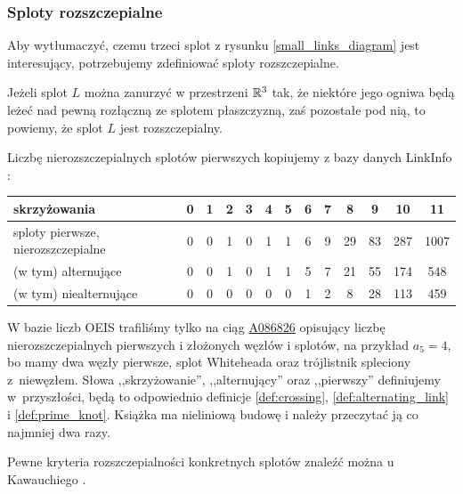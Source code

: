 
\subsubsection{Sploty rozszczepialne}
Aby wytłumaczyć, czemu trzeci splot z rysunku \ref{small_links_diagram} jest interesujący, potrzebujemy zdefiniować sploty rozszczepialne.

\begin{definition}[rozszczepialność]
%
    Jeżeli splot $L$ można zanurzyć w przestrzeni $\mathbb R^3$ tak, że niektóre jego ogniwa będą leżeć nad pewną rozłączną ze splotem płaszczyzną, zaś pozostałe pod nią, to powiemy, że splot $L$ jest rozszczepialny.
\end{definition}

Liczbę nierozszczepialnych splotów pierwszych kopiujemy z bazy danych LinkInfo \cite{linkinfo24}:
\renewcommand*{\arraystretch}{1.4}
\footnotesize
\begin{longtable}{lcccccccccccc}
    \hline
    \textbf{skrzyżowania} & 0 & 1 & 2 & 3 & 4 & 5 &  6 &  7 &  8 & 9 & 10 & 11 \\ \hline \endhead
    sploty pierwsze, nierozszczepialne & 0 & 0 & 1 & 0 & 1 & 1 & 6 & 9 & 29 & 83 & 287 & 1007 \\
    (w tym) alternujące & 0 & 0 & 1 & 0 & 1 & 1 & 5 & 7 & 21 & 55 & 174 & 548 \\
    (w tym) niealternujące & 0 & 0 & 0 & 0 & 0 & 0 & 1 & 2 & 8 & 28 & 113 & 459 \\
    \hline
\end{longtable}
\normalsize

W bazie liczb OEIS trafiliśmy tylko na ciąg \href{https://oeis.org/A086826}{A086826} opisujący liczbę nierozszczepialnych pierwszych i złożonych węzłów i splotów, na przykład $a_5 = 4$, bo mamy dwa węzły pierwsze, splot Whiteheada oraz trójlistnik spleciony z~niewęzłem.
Słowa ,,skrzyżowanie'', ,,alternujący'' oraz ,,pierwszy'' definiujemy w~przyszłości, będą to odpowiednio definicje \ref{def:crossing}, \ref{def:alternating_link} i \ref{def:prime_knot}.
%
%
%
Książka ma nieliniową budowę i należy przeczytać ją co najmniej dwa razy.

Pewne kryteria rozszczepialności konkretnych splotów znaleźć można u Kawauchiego \cite[s. 36-38]{kawauchi1996}.

